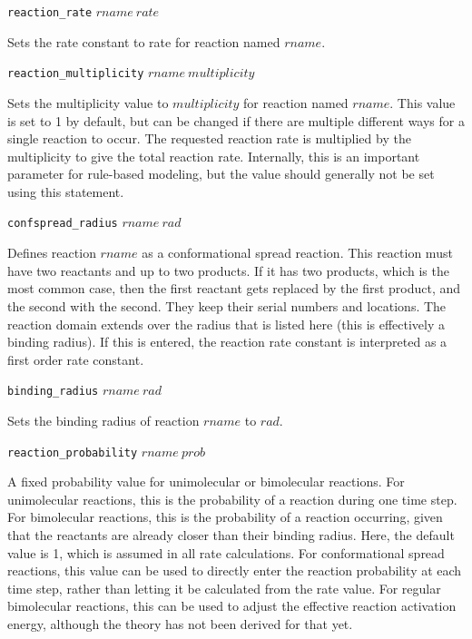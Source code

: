 \documentclass {scrbook}
\newcommand {\ttt} {\texttt}
\begin{document}
\begin{description}
\item{\ttt{reaction\_rate} $rname\ rate$}

Sets the rate constant to rate for reaction named $rname$.

\item{\ttt{reaction\_multiplicity} $rname\ multiplicity$}

Sets the multiplicity value to $multiplicity$ for reaction named $rname$. This value is set to 1 by default, but can be changed if there are multiple different ways for a single reaction to occur. The requested reaction rate is multiplied by the multiplicity to give the total reaction rate. Internally, this is an important parameter for rule-based modeling, but the value should generally not be set using this statement.

\item{\ttt{confspread\_radius} $rname\ rad$}

Defines reaction $rname$ as a conformational spread reaction. This reaction must have two reactants and up to two products. If it has two products, which is the most common case, then the first reactant gets replaced by the first product, and the second with the second. They keep their serial numbers and locations. The reaction domain extends over the radius that is listed here (this is effectively a binding radius). If this is entered, the reaction rate constant is interpreted as a first order rate constant.

\item{\ttt{binding\_radius} $rname\ rad$}

Sets the binding radius of reaction $rname$ to $rad$.

\item{\ttt{reaction\_probability} $rname\ prob$}

A fixed probability value for unimolecular or bimolecular reactions. For unimolecular reactions, this is the probability of a reaction during one time step. For bimolecular reactions, this is the probability of a reaction occurring, given that the reactants are already closer than their binding radius. Here, the default value is 1, which is assumed in all rate calculations. For conformational spread reactions, this value can be used to directly enter the reaction probability at each time step, rather than letting it be calculated from the rate value. For regular bimolecular reactions, this can be used to adjust the effective reaction activation energy, although the theory has not been derived for that yet.


\end{description}
\end{document}
